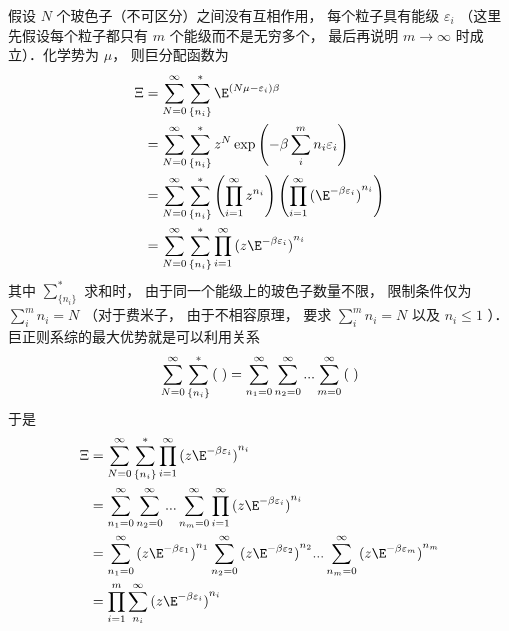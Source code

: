 
假设 $N$ 个玻色子（不可区分）之间没有互相作用， 每个粒子具有能级 ${\varepsilon_i}$ （这里先假设每个粒子都只有 $m$ 个能级而不是无穷多个， 最后再说明 $m \to \infty $ 时成立）．化学势为 $\mu $，  则巨分配函数为
\begin{equation}
  \begin{aligned}
\Xi & = \sum\limits_{N = 0}^\infty  {\sum\limits_{\{ {n_i}\} }^ *  {{\E^{(N\mu  - {\varepsilon_i})\beta }}} }  \\
& = \sum\limits_{N = 0}^\infty  {\sum\limits_{\{ {n_i}\} }^ *  {{z^N}\exp \left( { - \beta \sum\limits_i^m {{n_i}{\varepsilon_i}} } \right)} }  \\
& = \sum\limits_{N = 0}^\infty  {\sum\limits_{\{ {n_i}\} }^ *  {\left( {\prod\limits_{i = 1}^\infty  {{z^{{n_i}}}} } \right)\left( {\prod\limits_{i = 1}^\infty  {{{({\E^{ - \beta {\varepsilon_i}}})}^{{n_i}}}} } \right)} } \\
& = \sum\limits_{N = 0}^\infty  {\sum\limits_{\{ {n_i}\} }^ *  {\prod\limits_{i = 1}^\infty  {{{(z{\E^{ - \beta {\varepsilon_i}}})}^{{n_i}}}} } }
\end{aligned}
\end{equation}
其中 $\sum\limits_{\{ {n_i}\} }^ *  {} $ 求和时， 由于同一个能级上的玻色子数量不限， 限制条件仅为 $\sum\limits_i^m {{n_i}}  = N$ （对于费米子， 由于不相容原理， 要求 $\sum\limits_i^m {{n_i}}  = N$ 以及 ${n_i} \le 1$ ）．\\
巨正则系综的最大优势就是可以利用关系
\begin{equation}
  \sum\limits_{N = 0}^\infty  {\sum\limits_{\{ {n_i}\} }^ *  {({\kern 1pt} {\kern 1pt} {\kern 1pt} )} }  = \sum\limits_{{n_1} = 0}^\infty  {\sum\limits_{{n_2} = 0}^\infty  {...\sum\limits_{m = 0}^\infty  {({\kern 1pt} {\kern 1pt} {\kern 1pt} )} } } 
\end{equation}
于是
\begin{equation}
  \begin{aligned}
\Xi & = \sum\limits_{N = 0}^\infty  {\sum\limits_{\{ {n_i}\} }^ *  {\prod\limits_{i = 1}^\infty  {{{(z{\E^{ - \beta {\varepsilon_i}}})}^{{n_i}}}} } }  \\
& = \sum\limits_{{n_1} = 0}^\infty  {\sum\limits_{{n_2} = 0}^\infty  {...\sum\limits_{{n_m} = 0}^\infty  {\prod\limits_{i = 1}^\infty  {{{(z{\E^{ - \beta {\varepsilon_i}}})}^{{n_i}}}} } } }  \\
& = \sum\limits_{{n_1} = 0}^\infty  {{{(z{\E^{ - \beta {\varepsilon_1}}})}^{{n_1}}}\sum\limits_{{n_2} = 0}^\infty  {{{(z{\E^{ - \beta {\varepsilon_2}}})}^{{n_2}}}...\sum\limits_{{n_m} = 0}^\infty  {{{(z{\E^{ - \beta {\varepsilon_m}}})}^{{n_m}}}} } } \\
& = \prod\limits_{i = 1}^m {\sum\limits_{{n_i}}^\infty  {{{(z{\E^{ - \beta {\varepsilon_i}}})}^{{n_i}}}} }
\end{aligned}
\end{equation}
